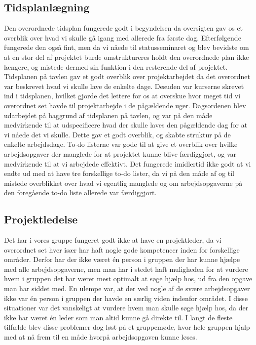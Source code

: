 \subsection{Tidsplanlægning}
Den overordnede tidsplan fungerede godt i begyndelsen da oversigten gav os et overblik over hvad vi skulle gå igang med allerede fra første dag. Efterfølgende fungerede den også fint, men da vi nåede til statusseminaret og blev bevidste om at en stor del af projektet burde omstruktureres holdt den overordnede plan ikke længere, og mistede dermed sin funktion i den resterende del af projektet. 
Tidsplanen på tavlen gav et godt overblik over projektarbejdet da det overordnet var beskrevet hvad vi skulle lave de enkelte dage. Desuden var kurserne skrevet ind i tidsplanen, hvilket gjorde det lettere for os at overskue hvor meget tid vi overordnet set havde til projektarbejde i de pågældende uger. 
Dagsordenen blev udarbejdet på baggrund af tidsplanen på tavlen, og var på den måde medvirkende til at udspecificere hvad der skulle laves den pågældende dag for at vi nåede det vi skulle. Dette gav et godt overblik, og skabte struktur på de enkelte arbejdsdage.
To-do listerne var gode til at give et overblik over hvilke arbejdsopgaver der manglede for at projektet kunne blive færdiggjort, og var medvirkende til at vi arbejdede effektivt. Det fungerede imidlertid ikke godt at vi endte ud med at have tre forskellige to-do lister, da vi på den måde af og til mistede overblikket over hvad vi egentlig manglede og om arbejdsopgaverne på den foregående to-do liste allerede var færdiggjort.

\subsection{Projektledelse}
Det har i vores gruppe fungeret godt ikke at have en projektleder, da vi overordnet set hver især har haft nogle gode kompetencer inden for forskellige områder. Derfor har der ikke været én person i gruppen der har kunne hjælpe med alle arbejdsopgaverne, men man har i stedet haft muligheden for at vurdere hvem i gruppen det har været mest optimalt at søge hjælp hos, ud fra den opgave man har siddet med. 
En ulempe var, at der ved nogle af de svære arbejdsopgaver ikke var én person i gruppen der havde en særlig viden indenfor området. I disse situationer var det vanskeligt at vurdere hvem man skulle søge hjælp hos, da der ikke har været én leder som man altid kunne gå direkte til. I langt de fleste tilfælde blev disse problemer dog løst på et gruppemøde, hvor hele gruppen hjalp med at nå frem til en måde hvorpå arbejdsopgaven kunne løses.


